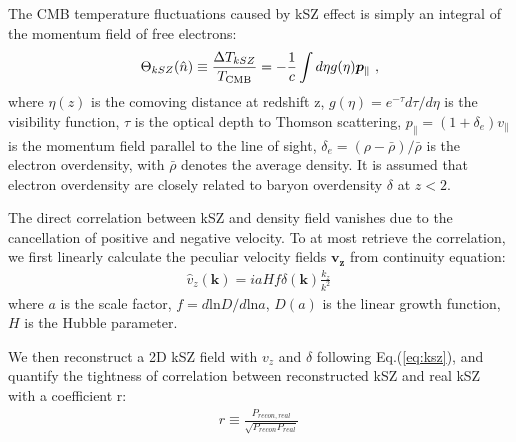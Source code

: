 \label{sec:kszRecon}
The CMB temperature fluctuations caused by kSZ effect is simply an integral of the 
momentum field of free electrons:
\begin{eqnarray}
\label{eq:ksz}
\Theta_{kSZ}(\hat n)\equiv\frac{\Delta T_{kSZ}}{T_{\mathrm{CMB}}}
=-\frac{1}{c}\int d\eta  g(\eta)  \bm{p}_\parallel\ ,
\end{eqnarray}
where $\eta(z)$ is the comoving distance at redshift z, $g(\eta)=e^{-\tau} d\tau/d\eta$ is the visibility function, $\tau$ is the optical depth to Thomson scattering, 
$p_\parallel=(1+\delta_e)v_\parallel$ 
is the momentum field parallel to the line of sight, 
$\delta_e=(\rho-\bar{\rho})/\bar{\rho}$ 
is the electron overdensity, 
with $\bar\rho$ denotes the average density. 
It is assumed that electron overdensity are closely 
related to baryon overdensity $\delta$ at $z<2$. 

The direct correlation between kSZ and density field vanishes due to the cancellation of positive and negative velocity.
To at most retrieve the correlation,  
we first linearly calculate the peculiar velocity fields $\bm{v_z}$ 
from continuity equation:
\begin{eqnarray}
	\label{eq:v}
\hat v_z(\bm{k})=i a H f\delta(\bm{k})\frac{k_z}{k^2}\,
\end{eqnarray}
where $a$ is the scale factor, $f=d\mathrm{ln}D/d\mathrm{ln}a$, $D(a)$ is the linear growth function, 
$H$ is the Hubble parameter.

We then reconstruct a 2D kSZ field with $v_z$ and $\delta$ 
following Eq.(\ref{eq:ksz}), 
and quantify the tightness of correlation between reconstructed kSZ and real kSZ 
with a coefficient r: 
\begin{eqnarray}
\label{eq:r}
	r\equiv \frac{P_{recon,real}}{\sqrt{P_{recon}P_{real}}}\,
\end{eqnarray}

